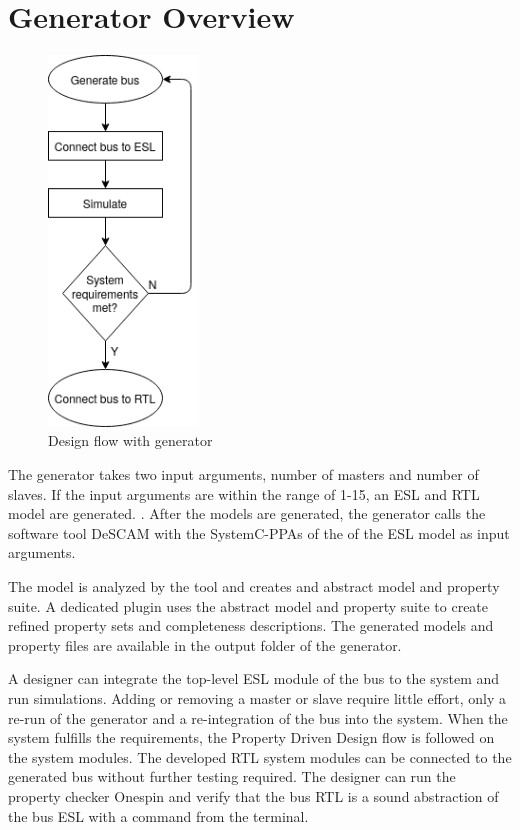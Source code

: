 \section{Generator Overview}
\begin{figure}
\includegraphics[width=4cm]{figs/Generator.png}
\caption{Design flow with generator}\label{fig:dflow}
\end{figure}  


The generator takes two input arguments, number of masters and number of slaves. If the input arguments are within the range of 1-15, an ESL and RTL model are generated. . After the models are generated, the generator calls the software tool DeSCAM with the SystemC-PPAs of the of the ESL model as input arguments. \par The model is analyzed by the tool and creates and abstract model and property suite. A dedicated plugin uses the abstract model and property suite to create refined property sets and completeness descriptions. The generated models and property files are available in the output folder of the generator. \par A designer can integrate the top-level ESL module of the bus to the system and run simulations. Adding or removing a master or slave require little effort, only a re-run of the generator and a re-integration of the bus into the system. When the system fulfills the requirements, the Property Driven Design flow is followed on the system modules. The developed RTL system modules can be connected to the generated bus without further testing required. The designer can run the property checker Onespin and verify that the bus RTL is a sound abstraction of the bus ESL with a command from the terminal. \par 
{} 

